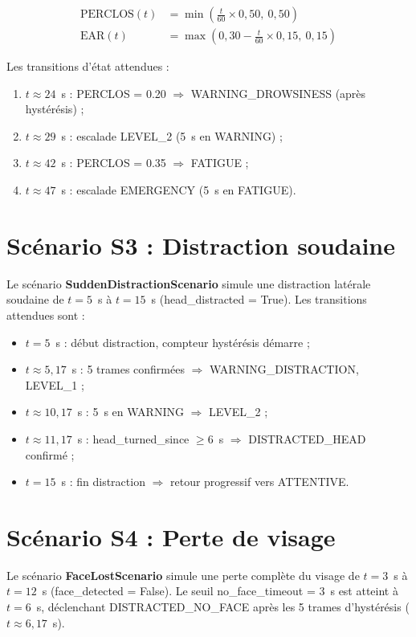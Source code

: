 \documentclass[12pt,a4paper]{report}
\begin{document}
\begin{align}
  \text{PERCLOS}(t) &= \min\!\left(\frac{t}{60} \times 0{,}50,\ 0{,}50\right) \\
  \text{EAR}(t) &= \max\!\left(0{,}30 - \frac{t}{60} \times 0{,}15,\ 0{,}15\right)
\end{align}

Les transitions d'\'etat attendues :
\begin{enumerate}
  \item $t \approx 24$~s : PERCLOS = 0.20 $\Rightarrow$ WARNING\_DROWSINESS (apr\`es hyst\'er\'esis) ;
  \item $t \approx 29$~s : escalade LEVEL\_2 (5~s en WARNING) ;
  \item $t \approx 42$~s : PERCLOS = 0.35 $\Rightarrow$ FATIGUE ;
  \item $t \approx 47$~s : escalade EMERGENCY (5~s en FATIGUE).
\end{enumerate}

\section{Sc\'enario S3 : Distraction soudaine}

Le sc\'enario \textbf{SuddenDistractionScenario} simule une distraction lat\'erale soudaine de $t = 5$~s \`a $t = 15$~s (head\_distracted = True). Les transitions attendues sont :
\begin{itemize}
  \item $t = 5$~s : d\'ebut distraction, compteur hyst\'er\'esis d\'emarre ;
  \item $t \approx 5{,}17$~s : 5 trames confirm\'ees $\Rightarrow$ WARNING\_DISTRACTION, LEVEL\_1 ;
  \item $t \approx 10{,}17$~s : 5~s en WARNING $\Rightarrow$ LEVEL\_2 ;
  \item $t \approx 11{,}17$~s : head\_turned\_since $\geq 6$~s $\Rightarrow$ DISTRACTED\_HEAD confirm\'e ;
  \item $t = 15$~s : fin distraction $\Rightarrow$ retour progressif vers ATTENTIVE.
\end{itemize}

\section{Sc\'enario S4 : Perte de visage}

Le sc\'enario \textbf{FaceLostScenario} simule une perte compl\`ete du visage de $t = 3$~s \`a $t = 12$~s (face\_detected = False). Le seuil no\_face\_timeout = 3~s est atteint \`a $t = 6$~s, d\'eclenchant DISTRACTED\_NO\_FACE apr\`es les 5 trames d'hyst\'er\'esis ($t \approx 6{,}17$~s).
\end{document}
